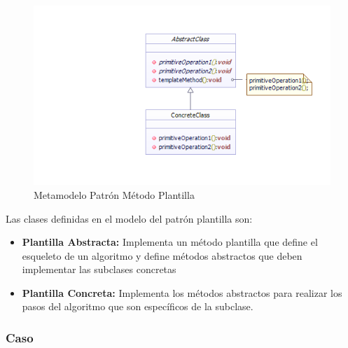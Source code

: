 \begin{figure}[th!]
	\centering
	\includegraphics[width=0.6\linewidth]{arquitectura/imagenes/ModeloPlantilla}
	\caption{Metamodelo Patrón Método Plantilla}
	\label{fig:metamodelo patron metodo plantilla}
\end{figure}

Las clases definidas en el modelo del patrón plantilla son:
\begin{itemize}
	\item \textbf{Plantilla Abstracta: }Implementa un método plantilla que define el esqueleto de un algoritmo y define métodos abstractos que deben implementar las subclases concretas
	\item \textbf{Plantilla Concreta: }Implementa los métodos abstractos para realizar los pasos del algoritmo que son específicos de la subclase.
\end{itemize}

\subsubsection{Caso}


\newpage